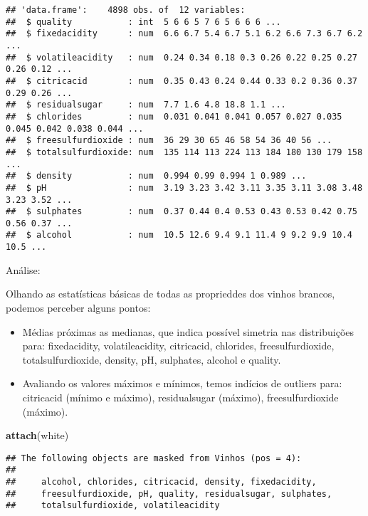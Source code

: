 \documentclass[]{article}
\newenvironment{Shaded}{\begin{snugshade}}{\end{snugshade}}
\newcommand{\KeywordTok}[1]{\textcolor[rgb]{0.13,0.29,0.53}{\textbf{#1}}}
\newcommand{\NormalTok}[1]{#1}
\begin{document}
\begin{verbatim}
## 'data.frame':    4898 obs. of  12 variables:
##  $ quality           : int  5 6 6 5 7 6 5 6 6 6 ...
##  $ fixedacidity      : num  6.6 6.7 5.4 6.7 5.1 6.2 6.6 7.3 6.7 6.2 ...
##  $ volatileacidity   : num  0.24 0.34 0.18 0.3 0.26 0.22 0.25 0.27 0.26 0.12 ...
##  $ citricacid        : num  0.35 0.43 0.24 0.44 0.33 0.2 0.36 0.37 0.29 0.26 ...
##  $ residualsugar     : num  7.7 1.6 4.8 18.8 1.1 ...
##  $ chlorides         : num  0.031 0.041 0.041 0.057 0.027 0.035 0.045 0.042 0.038 0.044 ...
##  $ freesulfurdioxide : num  36 29 30 65 46 58 54 36 40 56 ...
##  $ totalsulfurdioxide: num  135 114 113 224 113 184 180 130 179 158 ...
##  $ density           : num  0.994 0.99 0.994 1 0.989 ...
##  $ pH                : num  3.19 3.23 3.42 3.11 3.35 3.11 3.08 3.48 3.23 3.52 ...
##  $ sulphates         : num  0.37 0.44 0.4 0.53 0.43 0.53 0.42 0.75 0.56 0.37 ...
##  $ alcohol           : num  10.5 12.6 9.4 9.1 11.4 9 9.2 9.9 10.4 10.5 ...
\end{verbatim}

Análise:

Olhando as estatísticas básicas de todas as proprieddes dos vinhos
brancos, podemos perceber alguns pontos:

\begin{itemize}
\item
  Médias próximas as medianas, que indica possível simetria nas
  distribuições para: fixedacidity, volatileacidity, citricacid,
  chlorides, freesulfurdioxide, totalsulfurdioxide, density, pH,
  sulphates, alcohol e quality.
\item
  Avaliando os valores máximos e mínimos, temos indícios de outliers
  para: citricacid (mínimo e máximo), residualsugar (máximo),
  freesulfurdioxide (máximo).
\end{itemize}

\begin{Shaded}
\begin{Highlighting}[]
\KeywordTok{attach}\NormalTok{(white)}
\end{Highlighting}
\end{Shaded}

\begin{verbatim}
## The following objects are masked from Vinhos (pos = 4):
## 
##     alcohol, chlorides, citricacid, density, fixedacidity,
##     freesulfurdioxide, pH, quality, residualsugar, sulphates,
##     totalsulfurdioxide, volatileacidity
\end{verbatim}
\end{document}
